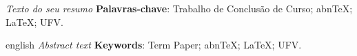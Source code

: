 \documentclass[
	12pt, %
	openright, %
	oneside, %
	a4paper, %
  sumario=tradicional, %
	english, %
	brazil, %
]{abntex2}
\begin{document}
\frenchspacing
\pretextual

\imprimircapa

\imprimirfolhaderosto


%

%

%


\begin{resumo}
  \noindent
  \textit{Texto do seu resumo} %
  \vspace{\onelineskip}
  \noindent
  \textbf{Palavras-chave}: Trabalho de Conclusão de Curso; abnTeX; LaTeX; UFV.
\end{resumo}

\begin{resumo}[Abstract]
  \begin{otherlanguage*}{english}
    \noindent
    \textit{Abstract text} %
    \vspace{\onelineskip}
    \noindent
    \textbf{Keywords}: Term Paper; abnTeX; LaTeX; UFV.
  \end{otherlanguage*}
\end{resumo}
\end{document}
